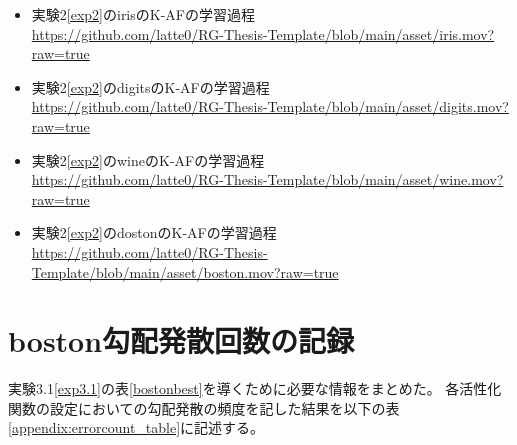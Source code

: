 \begin{itemize}
  \item 実験2\ref{exp2}のirisのK-AFの学習過程 \\ \href{https://github.com/latte0/RG-Thesis-Template/blob/main/asset/iris.mov?raw=true}{https://github.com/latte0/RG-Thesis-Template/blob/main/asset/iris.mov?raw=true}
  \item 実験2\ref{exp2}のdigitsのK-AFの学習過程 \\ \href{https://github.com/latte0/RG-Thesis-Template/blob/main/asset/digits.mov?raw=true}{https://github.com/latte0/RG-Thesis-Template/blob/main/asset/digits.mov?raw=true}
  \item 実験2\ref{exp2}のwineのK-AFの学習過程 \\ \href{https://github.com/latte0/RG-Thesis-Template/blob/main/asset/wine.mov?raw=true}{https://github.com/latte0/RG-Thesis-Template/blob/main/asset/wine.mov?raw=true}
  \item 実験2\ref{exp2}のdostonのK-AFの学習過程 \\ \href{https://github.com/latte0/RG-Thesis-Template/blob/main/asset/boston.mov?raw=true}{https://github.com/latte0/RG-Thesis-Template/blob/main/asset/boston.mov?raw=true}
\end{itemize}



\chapter{boston勾配発散回数の記録}
\label{appendix:error}

実験3.1\ref{exp3.1}の表\ref{bostonbest}を導くために必要な情報をまとめた。
各活性化関数の設定においての勾配発散の頻度を記した結果を以下の表\ref{appendix:errorcount_table}に記述する。

